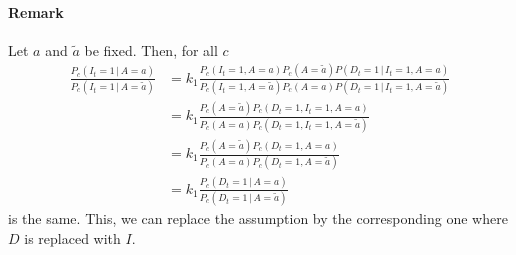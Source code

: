 \documentclass[a4paper]{article}
\begin{document}
\paragraph{Remark}
Let $a$ and $\tilde{a}$ be fixed. Then, for all $c$
\begin{align*}
\frac{P_c(I_t = 1\,|\,A = a)}{P_c(I_t = 1\,|\,A = \tilde{a})} 
&= k_1
\frac{P_c(I_t = 1,A = a)P_c(A = \tilde{a})
P(D_t = 1\,|\,I_t = 1, A = a)}
{P_c(I_t = 1,A = \tilde{a})P_c(A = a)P(D_t = 1\,|\,I_t = 1, A = \tilde{a})} \\
&= k_1
\frac{P_c(A = \tilde{a})
P_c(D_t = 1,I_t = 1, A = a)}
{P_c(A = a)P_c(D_t = 1,I_t = 1, A = \tilde{a})}\\
&= k_1
\frac{P_c(A = \tilde{a})
P_c(D_t = 1,A = a)}
{P_c(A = a)P_c(D_t = 1, A = \tilde{a})}\\
&= k_1
\frac{P_c(D_t = 1\,|\,A = a)}
{P_c(D_t = 1\,|\, A = \tilde{a})}
\end{align*}
is the same. This, we can replace the assumption by the corresponding one where $D$ is replaced with $I$.
\end{document}
